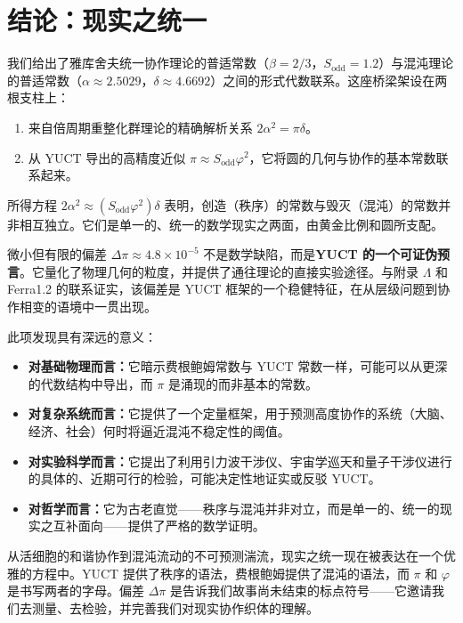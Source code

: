 \documentclass[12pt,a4paper]{article}
\begin{document}
	\section{结论：现实之统一}
	
	我们给出了雅库舍夫统一协作理论的普适常数（\(\beta = 2/3\)，\(S_{\mathrm{odd}} = 1.2\)）与混沌理论的普适常数（\(\alpha \approx 2.5029\)，\(\delta \approx 4.6692\)）之间的形式代数联系。这座桥梁架设在两根支柱上：
	\begin{enumerate}
		\item 来自倍周期重整化群理论的精确解析关系 \(2\alpha^2 = \pi \delta\)。
		\item 从 YUCT 导出的高精度近似 \(\pi \approx S_{\mathrm{odd}}\varphi^2\)，它将圆的几何与协作的基本常数联系起来。
	\end{enumerate}
	
	所得方程 \(2\alpha^2 \approx (S_{\mathrm{odd}}\varphi^2)\delta\) 表明，创造（秩序）的常数与毁灭（混沌）的常数并非相互独立。它们是单一的、统一的数学现实之两面，由黄金比例和圆所支配。
	
	微小但有限的偏差 \(\Delta\pi \approx 4.8\times10^{-5}\) 不是数学缺陷，而是\textbf{YUCT 的一个可证伪预言}。它量化了物理几何的粒度，并提供了通往理论的直接实验途径。与附录 \(\Lambda\) 和 Ferra1.2 的联系证实，该偏差是 YUCT 框架的一个稳健特征，在从层级问题到协作相变的语境中一贯出现。
	
	此项发现具有深远的意义：
	\begin{itemize}
		\item \textbf{对基础物理而言：}它暗示费根鲍姆常数与 YUCT 常数一样，可能可以从更深的代数结构中导出，而 \(\pi\) 是涌现的而非基本的常数。
		\item \textbf{对复杂系统而言：}它提供了一个定量框架，用于预测高度协作的系统（大脑、经济、社会）何时将逼近混沌不稳定性的阈值。
		\item \textbf{对实验科学而言：}它提出了利用引力波干涉仪、宇宙学巡天和量子干涉仪进行的具体的、近期可行的检验，可能决定性地证实或反驳 YUCT。
		\item \textbf{对哲学而言：}它为古老直觉——秩序与混沌并非对立，而是单一的、统一的现实之互补面向——提供了严格的数学证明。
	\end{itemize}
	
	从活细胞的和谐协作到混沌流动的不可预测湍流，现实之统一现在被表达在一个优雅的方程中。YUCT 提供了秩序的语法，费根鲍姆提供了混沌的语法，而 \(\pi\) 和 \(\varphi\) 是书写两者的字母。偏差 \(\Delta\pi\) 是告诉我们故事尚未结束的标点符号——它邀请我们去测量、去检验，并完善我们对现实协作织体的理解。
	
\end{document}
